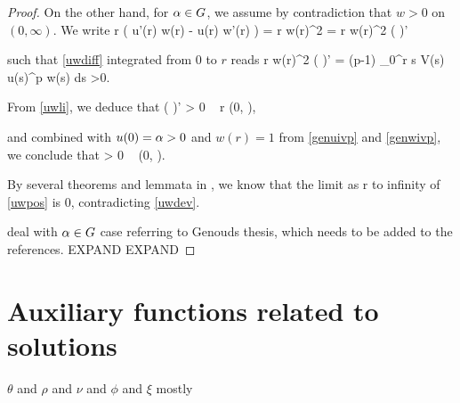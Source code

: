 \begin{proof}
On the other hand, for $\alpha \in G$, we assume by contradiction that $w > 0$
on $(0, \infty)$. 
We write
\be
    r \left( u'(r) w(r) - u(r) w'(r) \right)
    = r w(r)^2 
    = r w(r)^2 \left(  \right)'
\ee

such that \cref{uwdiff} integrated from $0$ to $r$ reads
\be \label{uwli}
r w(r)^2 \left(  \right)' = (p-1) \int_0^r s V(s) u(s)^p w(s) ds >0.
\ee

From \eqref{uwli}, we deduce that 
\be \label{uwdev}
    \left(  \right)' > 0 \quad {}~ r \in (0, \infty),
\ee

and combined with $u(0) = \alpha > 0$ and $w(r) = 1$ from \eqref{genuivp} and
\eqref{genwivp}, we conclude that
\be \label{uwpos}
     > 0 \quad {}~ (0, \infty).
\ee

{\red By several theorems and lemmata in \cite{genthes}, we know that the limit
as r to infinity of \eqref{uwpos} is 0, contradicting \eqref{uwdev}.}

{\red deal with $\alpha \in G$ case referring to Genouds thesis, which needs to be
added to the references. EXPAND EXPAND} 
\end{proof}

\section{Auxiliary functions related to solutions}
$\theta$ and $\rho$ and $\nu$ and $\phi$ and $\xi$ mostly

